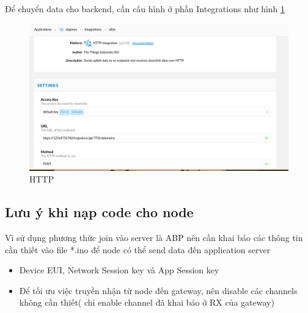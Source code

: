 Để chuyển data cho backend, cần cấu hình ở phần Integrations như hình \ref{fig:device_http}

\begin{figure}[H]
    \centering
    \includegraphics[width=\textwidth]{images/Quanh/http.png}
    \caption{HTTP}
    \label{fig:device_http}
\end{figure}


\subsection{Lưu ý khi nạp code cho node}

Vì sử dụng phương thức join vào server là ABP nên cần khai báo các thông tin cần thiết vào file *.ino để node có thể send data đến application server 

\begin{itemize}
    \item Device EUI, Network Session key và App Session key
    \item Để tối ưu việc truyền nhận từ node đến gateway,  nên disable các channels không cần thiết( chỉ enable channel đã khai báo ở RX của gateway)
\end{itemize}



